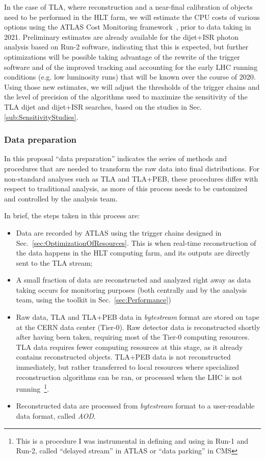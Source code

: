 In the case of TLA, where reconstruction and a near-final calibration of objects need to be performed in the HLT farm, we will estimate the CPU costs of various options using the ATLAS Cost Monitoring framework~\cite{CostMonitoringTim}, prior to data taking in 2021.  
Preliminary estimates are already available for the dijet+ISR photon analysis based on Run-2 software, indicating that this is expected, but further optimizations will be possible taking advantage of the rewrite of the trigger software and of the improved tracking and accounting for the early LHC running conditions (e.g. low luminosity runs) that will be known over the course of 2020. Using those new estimates, we will adjust the thresholds of the trigger chains and the level of precision of the algorithms used to maximize the sensitivity of the TLA dijet and dijet+ISR searches, based on the studies in Sec.\ref{sub:SensitivityStudies}. 
 



\subsubsection{Data preparation}


In this proposal “data preparation” indicates the series of methods and procedures that are needed to transform the raw data into final distributions. For non-standard analyses such as TLA and TLA+PEB, these procedures differ with respect to traditional analysis, as more of this process needs to be customized and controlled by the analysis team. 

In brief, the steps taken in this process are:

\begin{itemize}

\item Data are recorded by ATLAS using the trigger chains designed in Sec.~\ref{sec:OptimizationOfResources}. This is when real-time reconstruction of the data happens in the HLT computing farm, and its outputs are directly sent to the TLA stream;
\item A small fraction of data are reconstructed and analyzed right away as data taking occurs for monitoring purposes (both centrally and by the analysis team, using the toolkit in Sec.~\ref{sec:Performance})
\item Raw data, TLA and TLA+PEB data in \textit{bytestream} format are stored on tape at the CERN data center (Tier-0). 
Raw detector data is reconstructed shortly after having been taken, requiring most of the Tier-0 computing resources. 
TLA data requires fewer computing resources at this stage, as it already contains reconstructed objects. 
TLA+PEB data is not reconstructed immediately, but rather transferred to local resources where specialized reconstruction algorithms can be ran, or processed when the LHC is not running~\footnote{This is a procedure I was instrumental in defining and using in Run-1 and Run-2, called “delayed stream” in ATLAS or “data parking” in CMS}. 
\item Reconstructed data are processed from \textit{bytestream} format to a user-readable data format, called \textit{AOD}.  

\end{itemize}

